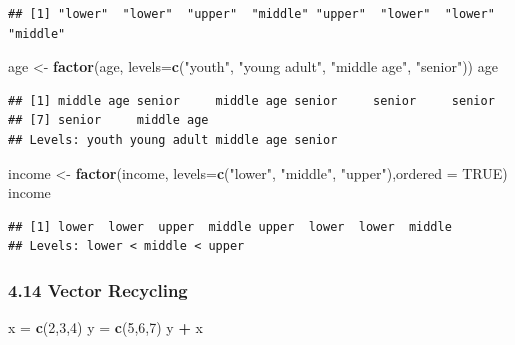 \documentclass[]{article}
\newenvironment{Shaded}{\begin{snugshade}}{\end{snugshade}}
\newcommand{\KeywordTok}[1]{\textcolor[rgb]{0.13,0.29,0.53}{\textbf{#1}}}
\newcommand{\DataTypeTok}[1]{\textcolor[rgb]{0.13,0.29,0.53}{#1}}
\newcommand{\DecValTok}[1]{\textcolor[rgb]{0.00,0.00,0.81}{#1}}
\newcommand{\StringTok}[1]{\textcolor[rgb]{0.31,0.60,0.02}{#1}}
\newcommand{\OtherTok}[1]{\textcolor[rgb]{0.56,0.35,0.01}{#1}}
\newcommand{\OperatorTok}[1]{\textcolor[rgb]{0.81,0.36,0.00}{\textbf{#1}}}
\newcommand{\NormalTok}[1]{#1}
\begin{document}
\begin{verbatim}
## [1] "lower"  "lower"  "upper"  "middle" "upper"  "lower"  "lower"  "middle"
\end{verbatim}

\begin{Shaded}
\begin{Highlighting}[]
\NormalTok{age <-}\StringTok{ }\KeywordTok{factor}\NormalTok{(age, }\DataTypeTok{levels=}\KeywordTok{c}\NormalTok{(}\StringTok{"youth"}\NormalTok{, }\StringTok{"young adult"}\NormalTok{, }\StringTok{"middle age"}\NormalTok{, }\StringTok{"senior"}\NormalTok{))}
\NormalTok{age}
\end{Highlighting}
\end{Shaded}

\begin{verbatim}
## [1] middle age senior     middle age senior     senior     senior    
## [7] senior     middle age
## Levels: youth young adult middle age senior
\end{verbatim}

\begin{Shaded}
\begin{Highlighting}[]
\NormalTok{income <-}\StringTok{ }\KeywordTok{factor}\NormalTok{(income, }\DataTypeTok{levels=}\KeywordTok{c}\NormalTok{(}\StringTok{"lower"}\NormalTok{, }\StringTok{"middle"}\NormalTok{, }\StringTok{"upper"}\NormalTok{),}\DataTypeTok{ordered =} \OtherTok{TRUE}\NormalTok{)}
\NormalTok{income}
\end{Highlighting}
\end{Shaded}

\begin{verbatim}
## [1] lower  lower  upper  middle upper  lower  lower  middle
## Levels: lower < middle < upper
\end{verbatim}

\subsubsection{4.14 Vector Recycling}\label{vector-recycling}

\begin{Shaded}
\begin{Highlighting}[]
\NormalTok{x =}\StringTok{ }\KeywordTok{c}\NormalTok{(}\DecValTok{2}\NormalTok{,}\DecValTok{3}\NormalTok{,}\DecValTok{4}\NormalTok{)}
\NormalTok{y =}\StringTok{ }\KeywordTok{c}\NormalTok{(}\DecValTok{5}\NormalTok{,}\DecValTok{6}\NormalTok{,}\DecValTok{7}\NormalTok{)}
\NormalTok{y }\OperatorTok{+}\StringTok{ }\NormalTok{x}
\end{Highlighting}
\end{Shaded}
\end{document}

